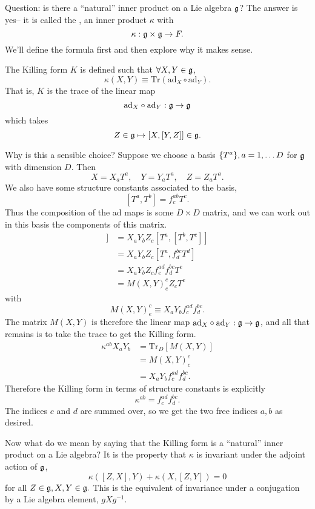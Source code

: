 Question: is there a ``natural'' inner product on a Lie algebra $\mathfrak{g}$? The answer is yes-- it is called the , an inner product $\kappa$ with
$$\kappa:\mathfrak{g} \times \mathfrak{g} \to F.$$
We'll define the formula first and then explore why it makes sense.
\begin{defn}
The Killing form $K$ is defined such that $\forall X,Y \in \mathfrak{g}$,
$$\kappa(X,Y)\equiv \text{Tr}(\text{ad}_X \circ \text{ad}_Y).$$
That is, $K$ is the trace of the linear map
$$\text{ad}_X \circ \text{ad}_Y: \mathfrak{g} \to \mathfrak{g}$$
which takes
$$Z\in \mathfrak{g} \mapsto [X,[Y,Z]] \in \mathfrak{g}.$$
\end{defn}
Why is this a sensible choice? Suppose we choose a basis $\{T^a\},a=1,\ldots D$ for $\mathfrak{g}$ with dimension $D$. Then
$$X=X_a T^a,\quad Y=Y_a T^a, \quad Z=Z_a T^a.$$
We also have some structure constants associated to the basis,
$$[T^a,T^b]=f^{ab}_c T^c.$$
Thus the composition of the ad maps is some $D\times D$ matrix, and we can work out in this basis the components of this matrix.
\begin{align*}
[X,[Y,Z]]&= X_a Y_b Z_c [T^a,[T^b,T^c]]\\
&= X_a Y_b Z_c [T^a,f^{bc}_d T^d]\\
&= X_a Y_b Z_c f^{ad}_e f^{bc}_d T^e\\
&= M(X,Y)^c_e Z_c T^e
\end{align*}
with 
$$M(X,Y)^c_e \equiv X_a Y_b f^{ad}_c f^{bc}_d.$$
The matrix $M(X,Y)$ is therefore the linear map $\text{ad}_X\circ \text{ad}_Y:\mathfrak{g} \to \mathfrak{g}$, and all that remains is to take the trace to get the Killing form.
\begin{align*}
\kappa^{ab}X_a Y_b &= \text{Tr}_D[M(X,Y)]\\
&= M(X,Y)^c_c\\
&= X_a Y_b f^{ad}_c f^{bc}_d.
\end{align*}
Therefore the Killing form in terms of structure constants is explicitly
$$\kappa^{ab}=f^{ad}_c f^{bc}_d.$$
The indices $c$ and $d$ are summed over, so we get the two free indices $a,b$ as desired.

Now what do we mean by saying that the Killing form is a ``natural'' inner product on a Lie algebra? It is the property that $\kappa$ is invariant under the adjoint action of $\mathfrak{g}$,
$$\kappa([Z,X],Y)+\kappa(X,[Z,Y])=0$$ for all $Z\in \mathfrak{g}, X,Y \in \mathfrak{g}.$ This is the equivalent of invariance under a conjugation by a Lie algebra element, $g X g^{-1}.$

